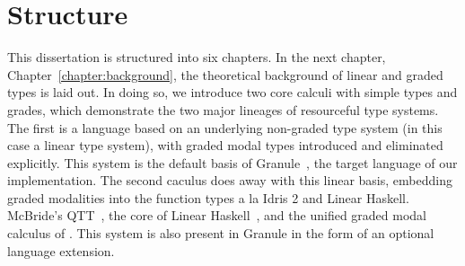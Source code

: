 \section{Structure}

This dissertation is structured into six chapters. In the next chapter,
Chapter~\ref{chapter:background}, the theoretical background of linear and
graded types is laid out. In doing so, we introduce two core calculi with simple
types and grades, which demonstrate the two major lineages of resourceful type
systems. The first is a language based on an underlying non-graded type system
(in this case a linear type system), with graded modal types introduced and
eliminated explicitly. This system is the default basis of
Granule~\citep{DBLP:journals/pacmpl/OrchardLE19}, the target language of our
implementation. The second caculus does away with this linear basis, embedding
graded modalities into the function types a la Idris 2 and Linear Haskell.
McBride's QTT~\citep{McBride2016,quantitative-type-theory}, the core of Linear
Haskell~\citep{DBLP:journals/pacmpl/BernardyBNJS18}, and the unified graded
modal calculus of \citep{DBLP:journals/pacmpl/AbelB20}. This system is also 
present in Granule in the form of an optional language extension.

